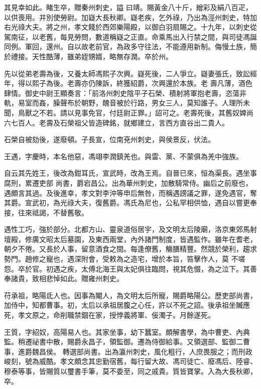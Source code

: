 \begin{pinyinscope}
 其見幸如此。睹生卒，贈秦州刺史，謚
 曰靖。賜黃金八十斤，繒彩及絹八百疋，以供喪用。并別使勞尉。加嶷大長秋卿。嶷老疾，乞外祿，乃出為涇州刺史，特加右光祿大夫。將之州，孝文餞於西郊樂陽殿，以御白羽扇賜之。十九年，以刺史從駕南征，以老舊，每見勞問，數道稱嶷之正直。命乘馬出入行禁之間，與司徒馮誕同例。軍回，還州。自以故老前官，為政多守往法，不能遵用新制。侮慢土族，簡於禮接。天性酷薄，雖弟姪甥婿，略無存潤。卒於州。



 先以從弟老壽為後，又養太師馮熙子次興。嶷死後，二人爭立。嶷妻張氏，致訟經年，得以熙子為後。老壽亦仍陳訴，終獲紹爵，次興還於本族。老
 壽凡薄，酒色肆情。御史中尉王顯奏言：「前洛州刺史陰平子石榮、積射將軍抱老壽，恣蕩非軌，易室而姦，臊聲布於朝野，醜音被於行路，男女三人，莫知誰子。人理所未聞，鳥獸之不若。請以見事免官，付廷尉正罪。」詔可之。老壽死後，其舊奴婢尚六七百人。老壽及石榮祖父皆造碑銘，就鄉建立，言西方直谷出二貴人。



 石榮自被劾後，遂廢頓。子長宣，位南兗州刺史，與侯景反，伏法。



 王遇，字慶時，本名他惡，馮翊李潤鎮羌也。與雷、黨、不蒙俱為羌中強族。



 自云其先姓王，後改為鉗耳氏，宣武時，改為王焉。自晉已來，恒為渠長。遇坐事腐刑，累遷吏部
 尚書，爵宕昌公。出為華州刺史，加散騎常侍。幽后之前廢也，遇頗言其過。及後進幸，孝文對李沖等申后無咎，而稱遇謗議之罪，遂免遇官，奪其爵。宣武初，為光祿大夫，復舊爵。馮氏為尼也，公私罕相供恤，遇自以嘗更奉接，往來祗謁，不替舊敬。



 遇性工巧，強於部分。北都方山、靈泉道俗居宇，及文明太后陵廟，洛京東郊馬射壇殿，修廣文昭太后墓園，及東西兩堂，內外諸門制度，皆遇監作。雖年在耆老，朝夕不倦。又長於人事，留意酒食之間。每逢僚舊，觴膳精豐。然競於榮利，趨求勢門。趙修之寵也，遇深附會，受敕為之造宅，增於本旨，笞擊作人，莫
 不嗟怨。卒於官。初遇之疾，太傅北海王與太妃俱往臨問，視其危惙，為之泣下。其善奉諸貴，致相悲悼如此。贈雍州刺史。



 苻承祖，略陽氐人也。因事為閹人，為文明太后所寵，賜爵略陽公。歷吏部尚書，加侍中，知都曹事。初，太后以承祖居腹之心任，許以不死之詔。後承祖坐贓應死，孝文原之，命削職禁錮在家，授悖義將軍、佞濁子。月餘遂死。



 王質，字紹奴，高陽易人也。其家坐事，幼下蠶室。頗解書學，為中曹吏、內典監。稍遷祕書中散，賜爵永昌子，領監御。遷為侍御給事。又領選部、監御二曹事，進爵魏昌侯。
 轉選部尚書。出為瀛州刺史，風化粗行，人庶畏服之；而刑政峻刻，號為威酷。孝文頗念其忠勤宿舊，每行留大故、馮司徒亡、廢馮后、陸睿、穆泰等事，皆賜質以璽書手筆，莫不委至，同之戚貴。質皆寶掌。入為大長秋卿，卒。




\end{pinyinscope}

